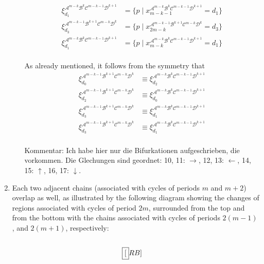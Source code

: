 \documentclass[12pt]{article}
\newcommand{\A}{{\mathcal A}}
\newcommand{\B}{{\mathcal B}}
\newcommand{\C}{{\mathcal C}}
\newcommand{\D}{{\mathcal D}}
\begin{document}
\begin{enumerate}
\begin{itemize}
\begin{align}
              \xi^{\A^{m-k}\B^k\C^{m-k-1}\D^{k+1}}_{d_1} & =
              \{ p \mid
              x_{m-k-1}^{\A^{m-k}\B^k\C^{m-k-1}\D^{k+1}} = d_1
              \}
              \\
              \xi^{\A^{m-k-1}\B^{k+1}\C^{m-k}\D^k}_{d_3} & =
              \{ p \mid
              x_{2m-k}^{\A^{m-k-1}\B^{k+1}\C^{m-k}\D^k} = d_3
              \}                                             \\
              \xi^{\A^{m-k}\B^k\C^{m-k-1}\D^{k+1}}_{d_1} & =
              \{ p \mid
              x_{m-k}^{\A^{m-k}\B^k\C^{m-k-1}\D^{k+1}} = d_1
              \}
            \end{align} \\
            As already mentioned, it follows from the symmetry that
            \begin{align}
              \xi^{\A^{m-k-1}\B^{k+1}\C^{m-k}\D^k}_{d_0} & \equiv
              \xi^{\A^{m-k}\B^k\C^{m-k-1}\D^{k+1}}_{d_2}          \\
              \xi^{\A^{m-k-1}\B^{k+1}\C^{m-k}\D^k}_{d_2} & \equiv
              \xi^{\A^{m-k}\B^k\C^{m-k-1}\D^{k+1}}_{d_0}          \\
              \xi^{\A^{m-k-1}\B^{k+1}\C^{m-k}\D^k}_{d_3} & \equiv
              \xi^{\A^{m-k}\B^k\C^{m-k-1}\D^{k+1}}_{d_1}          \\
              \xi^{\A^{m-k-1}\B^{k+1}\C^{m-k}\D^k}_{d_3} & \equiv
              \xi^{\A^{m-k}\B^k\C^{m-k-1}\D^{k+1}}_{d_1}
            \end{align}
            \\
            Kommentar: Ich habe hier nur die Bifurkationen aufgeschrieben, die vorkommen.
            Die Glechungen sind geordnet: 10, 11: $\rightarrow$, 12, 13: $\leftarrow$, 14, 15: $\uparrow$, 16, 17: $\downarrow$.
        \end{itemize}
        \clearpage
  \item
        Each two adjacent chains (associated with cycles of periods $m$ and
        $m+2$) overlap as well, as illustrated by the following diagram
        showing the changes of regions associated with cycles of period $2m$,
        surrounded from the top and from the bottom with the chains
        associated with cycles of periods $2(m-1)$, and $2(m+1)$,
        respectively:
        \begin{equation}
          \begin{split}
            &
            \fbox[RB]{
              \begin{minipage}[c][4.5em][c]{3ex}\small

\end{minipage}}
\end{split}
\end{equation}
\end{enumerate}
\end{document}
